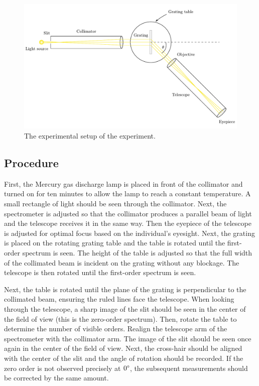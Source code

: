 \documentclass[10pt]{article}
\begin{document}
\begin{figure}[hbt!]
  \centering
  \includegraphics[scale=0.6]{figures/f1.pdf}
  \caption{The experimental setup of the experiment.}
  \label{fig:1}
\end{figure}

\subsection*{Procedure}

First, the Mercury gas discharge lamp is placed in front of the collimator and turned on for ten minutes to allow the lamp to reach a constant temperature. A small rectangle of light should be seen through the collimator. Next, the spectrometer is adjusted so that the collimator produces a parallel beam of light and the telescope receives it in the same way. Then the eyepiece of the telescope is adjusted for optimal focus based on the individual's eyesight. Next, the grating is placed on the rotating grating table and the table is rotated until the first-order spectrum is seen. The height of the table is adjusted so that the full width of the collimated beam is incident on the grating without any blockage. The telescope is then rotated until the first-order spectrum is seen. 

Next, the table is rotated until the plane of the grating is perpendicular to the collimated beam, ensuring the ruled lines face the telescope. When looking through the telescope, a sharp image of the slit should be seen in the center of the field of view (this is the zero-order spectrum). Then, rotate the table to determine the number of visible orders. Realign the telescope arm of the spectrometer with the collimator arm. The image of the slit should be seen once again in the center of the field of view. Next, the cross-hair should be aligned with the center of the slit and the angle of rotation should be recorded. If the zero order is not observed precisely at $0\degree$, the subsequent measurements should be corrected by the same amount.
\end{document}
